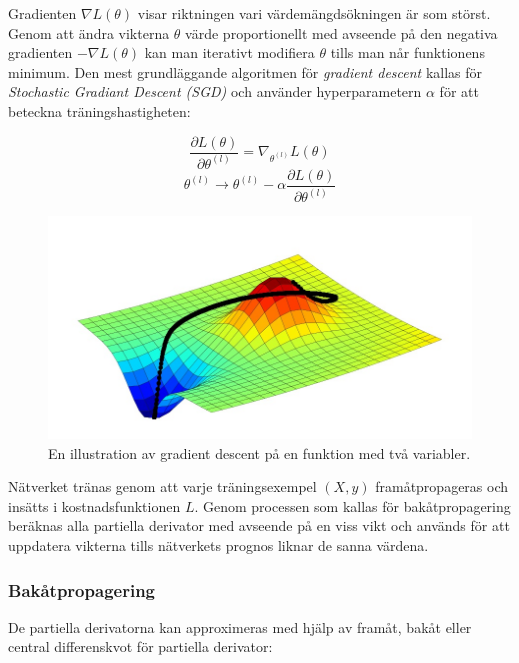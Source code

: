 \documentclass[a4paper,11pt,twoside]{article}
\newcommand*{\pd}[2]{\ensuremath{\dfrac{\partial #1}{\partial #2}}}
\begin{document}
Gradienten $\nabla L(\theta)$ visar riktningen vari värdemängdsökningen är som störst. Genom att ändra vikterna $\theta$ värde proportionellt med avseende på den negativa gradienten $-\nabla L(\theta)$ kan man iterativt modifiera $\theta$ tills man når funktionens minimum. Den mest grundläggande algoritmen för \textit{gradient descent} kallas för \textit{Stochastic Gradiant Descent (SGD)} och använder hyperparametern $\alpha$ för att beteckna träningshastigheten: \cite{gradient} \cite{convmath} \cite{wikiStanford}

\begin{equation}
\pd{L(\theta)}{\theta^{(l)}} = \nabla_{\theta^{(l)}} L(\theta)
\end{equation}
\begin{equation}\label{SGD}
\theta^{(l)} \to \theta^{(l)} - \alpha \pd{L(\theta)}{\theta^{(l)}}
\end{equation}
\begin{figure}[h]\label{figSGD}
	\centering
  		\includegraphics[scale=0.5]{SGD.png}
  	\caption{En illustration av gradient descent på en funktion med två variabler.\cite{figSGD}}
\end{figure}
Nätverket tränas genom att varje träningsexempel $(X,y)$ framåtpropageras och insätts i kostnadsfunktionen $L$. Genom processen som kallas för bakåtpropagering beräknas alla partiella derivator med avseende på en viss vikt och används för att uppdatera vikterna tills nätverkets prognos liknar de sanna värdena. \cite{gradient} \cite{convmath} \cite{wikiStanford}
\subsubsection{Bakåtpropagering}
De partiella derivatorna kan approximeras med hjälp av framåt, bakåt eller central differenskvot för partiella derivator: \cite{wikiStanford} \cite{gradient}
\end{document}
